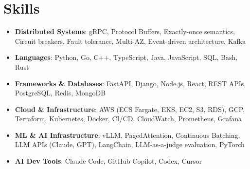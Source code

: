 \documentclass[letterpaper,11pt]{article}
\newcommand{\resumeSubHeadingListStart}{\begin{itemize}[leftmargin=0.15in, label={}]}
\newcommand{\resumeSubHeadingListEnd}{\end{itemize}}
\newcommand{\resumeSkillHeading}[2]{%
  \item\small{\textbf{#1}: #2 \vspace{-9pt}}%
}
\begin{document}
\section{Skills}
  \resumeSubHeadingListStart
    \resumeSkillHeading{Distributed Systems}{gRPC, Protocol Buffers, Exactly-once semantics, Circuit breakers, Fault tolerance, Multi-AZ, Event-driven architecture, Kafka}
    \resumeSkillHeading{Languages}{Python, Go, C++, TypeScript, Java, JavaScript, SQL, Bash, Rust}
    \resumeSkillHeading{Frameworks \& Databases}{FastAPI, Django, Node.js, React, REST APIs, PostgreSQL, Redis, MongoDB}
    \resumeSkillHeading{Cloud \& Infrastructure}{AWS (ECS Fargate, EKS, EC2, S3, RDS), GCP, Terraform, Kubernetes, Docker, CI/CD, CloudWatch, Prometheus, Grafana}
    \resumeSkillHeading{ML \& AI Infrastructure}{vLLM, PagedAttention, Continuous Batching, LLM APIs (Claude, GPT), LangChain, LLM-as-a-judge evaluation, PyTorch}
    \resumeSkillHeading{AI Dev Tools}{Claude Code, GitHub Copilot, Codex, Cursor}
  \resumeSubHeadingListEnd
\end{document}

